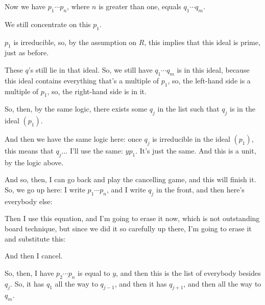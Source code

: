\begin{proofWrapper}
\begin{speech}[00:41:44 - 00:43:15]
Now we have $p_1 \cdots p_n$,  where $n$ is greater than one, equals $q_1 \cdots q_m$. 

We still concentrate on this $p_1$.

$p_1$ is irreducible,  so, by the assumption on $R$, this implies that this ideal is prime,  just as before.

These $q$'s still lie in that ideal. So, we still have $q_1 \cdots q_m$ is in this ideal,  because this ideal contains everything that's a multiple of $p_1$, so, the left-hand side is a multiple of $p_1$, so, the right-hand side is in it.
\end{speech}

\begin{speech}[00:43:15 - 00:45:19]
So, then, by the same logic, there exists some $q_j$ in the list  such that $q_j$ is in the ideal $(p_1)$.

And then we have the same logic here: once $q_j$ is irreducible in the ideal $(p_1)$, this means that $q_j$... I'll use the same: $y p_1$.  It's just the same. And this is a unit,  by the logic above.

And so, then, I can go back and play the cancelling game, and this will finish it. So, we go up here: I write $p_1 \cdots p_n$,  and I write $q_j$ in the front, and then here's everybody else: 

Then I use this equation, and I'm going to erase it now, which is not outstanding board technique, but since we did it so carefully up there, I'm going to erase it and substitute this: 

And then I cancel. 

So, then, I have $p_2 \cdots p_n$ is equal to $y$, and then this is the list of everybody besides $q_j$. So, it has $q_1$ all the way to $q_{j-1}$, and then it has $q_{j+1}$, and then all the way to $q_m$. 


\end{speech}
\end{proofWrapper}
